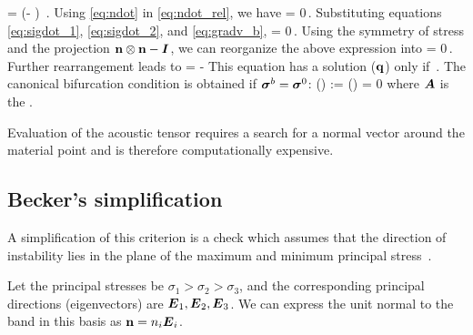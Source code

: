             = \Bn \cdot \Grad{\Bv} \cdot \left(\Bn \otimes \Bn - \BI\right)  \,.
\Eeq
Using \eqref{eq:ndot} in \eqref{eq:ndot_rel}, we have
\Beq 
  \Bn \cdot {} = 0\,.
\Eeq
Substituting equations \eqref{eq:sigdot_1}, \eqref{eq:sigdot_2}, and \eqref{eq:gradv_b},
\Beq 
  \Bn \cdot {} = 0\,.
\Eeq
Using the symmetry of stress and the projection $\mathbf{n}\otimes\mathbf{n} - \boldsymbol{I}$, we can reorganize
the above expression into 
\Beq 
  \Bn \cdot {} = 0\,.
\Eeq
Further rearrangement leads to
\Beq
   \cdot \Bq  =  -\Bn \cdot {} 
\Eeq
This equation has a solution ($\mathbf{q}$) only if 
\Beq
  \det{}  \,.
\Eeq
The canonical bifurcation condition is obtained if $\boldsymbol{\sigma}^b = \boldsymbol{\sigma}^0$:
\Beq \label{eq:acoustic_tensor}
  \det(\BA) := \det(\Bn \cdot \SfC \cdot \Bn) = 0 
\Eeq
where $\boldsymbol{A}$ is the .

Evaluation of the acoustic tensor requires a search for a normal vector 
around the material point and is therefore computationally expensive.  

\subsection{Becker's simplification}
A simplification of this criterion is a check which assumes that the direction 
of instability lies in the plane of the maximum and minimum principal 
stress~\cite{Becker2002}.  

Let the principal stresses be $\sigma_1 > \sigma_2 > \sigma_3$, and the 
corresponding principal directions (eigenvectors) are $\boldsymbol{E}_1, \boldsymbol{E}_2, \boldsymbol{E}_3$.
We can express the unit normal to the band in this basis as $\mathbf{n} = n_i \boldsymbol{E}_i$.

